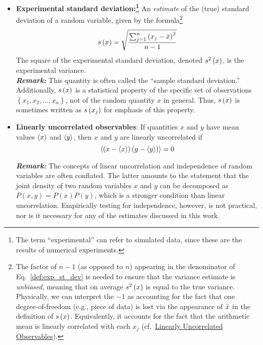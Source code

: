\begin{itemize}
\item {\bf Experimental standard deviation:\footnote{
      The term ``experimental'' can refer to simulated data, since these are the results of numerical experiments.
}
} An \emph{estimate} of the (true) standard deviation of a random variable, given by the formula\footnote{The factor of $n-1$ (as opposed to $n$) appearing in the denominator of Eq.~\ref{def:exp_st_dev} is needed to ensure that the variance estimate is {\it unbiased}, meaning that on average $s^2\left( x \right)$ is equal to the true variance. Physically, we can interpret the $-1$ as accounting for the fact that one degree-of-freedom (e.g., piece of data) is lost via the appearance of $\bar{x}$ in the definition of $s\left( x \right)$.  Equivalently, it accounts for the fact that the arithmetic mean is linearly correlated with each $x_j$ (cf.\ \hyperref[def:unc_obs]{Linearly Uncorrelated Observables}).}
  \begin{equation}
    s\left( x \right) = \sqrt{\dfrac{\sum_{j=1}^n\left(x_j - \bar{x}\right)^2}{n-1}} \label{def:exp_st_dev}
  \end{equation}
  \smallskip
  The square of the experimental standard deviation, denoted $s^2\left( x \right)$, is the experimental variance.\\
  \textbf{\textit{Remark:}} This quantity is often called the ``sample standard deviation.''
  Additionally, $s\left( x \right)$ is a statistical property of the specific set of observations $\left\{x_1,x_2,...,x_n\right\}$, not of the random quantity $x$ in general.
  Thus, $s\left( x \right)$ is sometimes written as $s\left( x_j \right)$ for emphasis of this property.

  \item {\bf Linearly uncorrelated observables}:  If quantities $x$ and $y$ have mean values $\langle x \rangle$ and $\langle y \rangle$, then $x$ and $y$ are linearly uncorrelated if
\begin{equation}
  \langle  \left(x - \langle x \rangle \right) \left(y - \langle y \rangle \right)  \rangle = 0 \label{def:unc_obs}
\end{equation}

\textbf{\textit{Remark:}} The concepts of linear uncorrelation and independence of random variables are often conflated.  The latter amounts to the statement that the joint density of two random variables $x$ and $y$ can be decomposed as $P(x,y)=P(x)P(y)$, which is a stronger condition than linear uncorrelation.  Empirically testing for independence, however, is not practical, nor is it necessary for any of the estimates discussed in this work.
  

\end{itemize}

